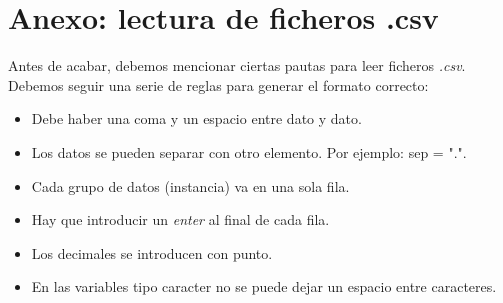 \documentclass [a4paper] {article}
\begin{document}
\section{Anexo: lectura de ficheros .csv}
Antes de acabar, debemos mencionar ciertas pautas para leer ficheros \textit{.csv}. Debemos seguir una serie de reglas para generar el formato correcto:
\begin{itemize}
	\item Debe haber una coma y un espacio entre dato y dato.
	\item Los datos se pueden separar con otro elemento. Por ejemplo: sep = ".".
	\item Cada grupo de datos (instancia) va en una sola fila.
    \item Hay que introducir un \textit{enter} al final de cada fila.
	\item Los decimales se introducen con punto.
	\item En las variables tipo caracter no se puede dejar un espacio entre caracteres.
\end{itemize}
\end{document}
